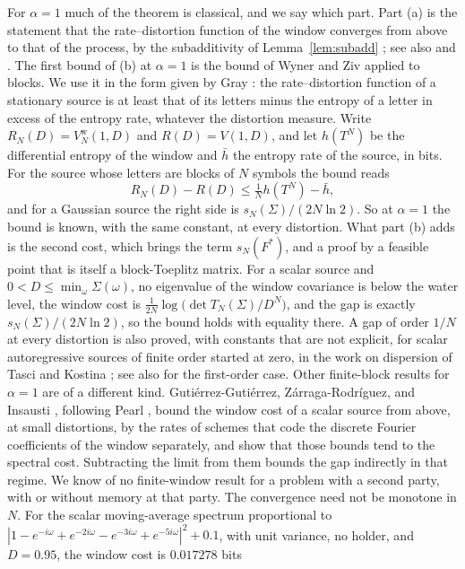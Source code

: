 \documentclass[11pt,onecolumn]{IEEEtran}
\begin{document}
For $\alpha=1$ much of the theorem is classical, and we say which part.
Part (a) is the statement that the rate--distortion function of the
window converges from above to that of the process, by the
subadditivity of Lemma~\ref{lem:subadd}
\cite[Sec.~10.6]{gray1990eit}; see also \cite[Ch.~9]{gallager1968} and
\cite{berger1971}. The first bound of (b) at $\alpha=1$ is the bound of
Wyner and Ziv \cite{wynerziv1971} applied to blocks. We use it in the
form given by Gray \cite[Sec.~4.7.1]{gray1990sct}: the rate--distortion function of a
stationary source is at least that of its letters minus the entropy of
a letter in excess of the entropy rate, whatever the distortion
measure. Write $R_N(D)=V^{\mathrm w}_N(1,D)$ and $R(D)=V(1,D)$, and let
$h(T^N)$ be the differential entropy of the window and $\bar h$ the
entropy rate of the source, in bits. For the source whose letters are
blocks of $N$ symbols the bound reads
\[
R_N(D)-R(D)\le\tfrac1Nh(T^N)-\bar h ,
\]
and for a Gaussian source the right side is $s_N(\Sigma)/(2N\ln2)$.
So at $\alpha=1$ the bound is known, with the same constant, at every
distortion. What part (b) adds is the second cost, which brings the
term $s_N(F^\ast)$, and a proof by a feasible point that is itself a
block-Toeplitz matrix. For a scalar source and
$0<D\le\min_\omega\Sigma(\omega)$, no eigenvalue of the window covariance
is below the water level, the window cost is
$\tfrac1{2N}\log\bigl(\det T_N(\Sigma)/D^N\bigr)$, and the gap is exactly
$s_N(\Sigma)/(2N\ln2)$, so the bound holds with equality there. A gap
of order $1/N$ at every distortion is also proved, with constants that
are not explicit, for scalar autoregressive sources of finite order
started at zero, in the work on dispersion of Tasci and Kostina
\cite{tasci2026}; see also \cite{tian2019} for the first-order case.
Other finite-block
results for $\alpha=1$ are of a different kind.
Guti\'errez-Guti\'errez, Z\'arraga-Rodr\'iguez, and Insausti
\cite{gutierrez2017}, following Pearl \cite{pearl1973}, bound the window
cost of a scalar source from above, at small distortions, by the rates
of schemes that code the discrete Fourier coefficients of the window
separately, and show that those bounds tend to the spectral cost.
Subtracting the limit from them bounds the gap indirectly in that
regime. We know of no finite-window result for a problem with a second
party, with or without memory at that party. The convergence need not
be monotone
in $N$. For the scalar moving-average spectrum proportional to
$|1-e^{-i\omega}+e^{-2i\omega}-e^{-3i\omega}+e^{-5i\omega}|^2+0.1$, with unit
variance, no holder, and $D=0.95$, the window cost is $0.017278$ bits
\end{document}
